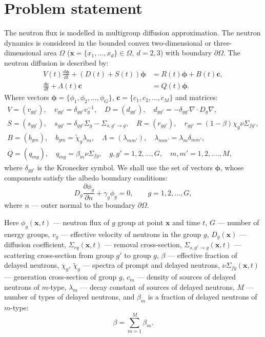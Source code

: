 \documentclass[a4paper]{jpconf}
\begin{document}
\section{Problem statement}
The neutron flux is modelled in multigroup diffusion approximation. The neutron dynamics is considered in the bounded convex two-dimensional or three-dimensional area  $\Omega$ ($\bm x = \{x_1, ..., x_d\} \in \Omega, \ d = 2,3$) with boundary $\partial \Omega$. The neutron diffusion is described by:
\begin{equation}\label{1}
\begin{split}
V(t) \frac{d \bm \phi}{d t} + (D(t)+S(t)) \bm \phi &= R(t) \bm \phi + B(t)\bm c,
\\
\frac{d \bm c}{d t} + \Lambda(t)\bm c &= Q(t) \bm \phi. 
\end{split}
\end{equation}  
Where vectors $\bm \phi = \{\phi_1, \phi_2, ..., \phi_G\}$, $\bm c = \{c_1, c_2, ..., c_M\}$ 
and matrices:
\[
\begin{aligned}
 V = (v_{g g'}), \quad v_{g g'} = \delta_{g g'} v_g^{-1}, \quad 
 D = (d_{g g'}), \quad d_{g g'} = - \delta_{g g'} \nabla \cdot D_g \nabla, \\
 S = (s_{g g'}), \quad  s_{g g'} =  \delta_{g g'} \Sigma_g - \Sigma_{s,g'\rightarrow g}, \quad R  = (r_{g g'}), \quad  r_{g g'} = (1-\beta)\chi_g \nu \Sigma_{fg'}, \\
 B = (b_{g m}), \quad b_{g m}  = \widetilde{\chi}_g \lambda_m, \quad
\Lambda = (\lambda_{m m'}), \quad  \lambda_{m m'} = \lambda_m \delta_{m m'}, \\
 Q = (q_{mg}), \quad  q_{mg}  = \beta_m \nu \Sigma_{fg}, \quad g, g' = 1,2, ..., G, \quad 
 m, m' = 1,2, ....,M,
\end{aligned}
\]
where
$\delta_{g g'}$ is the Kronecker symbol. We shall use the set of vectors $\bm \phi$, whose components 
satisfy the albedo boundary conditions: 
\begin{equation}\label{2}
 D_g\frac{\partial \phi_g}{\partial n} + \gamma_g \phi_g = 0, \quad 
 \quad g = 1,2, ..., G ,
\end{equation}
where $n$ --- outer normal to the boundary $\partial \Omega$.

Here $\phi_g(\bm x,t)$ --- neutron flux of $g$ group at point $\bm x$ and time $t$,
$G$ --- number of energy groups,
$v_g$ --- effective velocity of neutrons in the group $g$,
$D_g(\bm x)$ --- diffusion coefficient, $\Sigma_{rg}(\bm x,t)$ --- removal cross-section,
$\Sigma_{s,g'\rightarrow g}(\bm x,t)$ --- scattering cross-section from group $g'$ to group $g$,
$\beta$ --- effective fraction of delayed neutrons, $\chi_g$, $\widetilde{\chi}_g$  --- spectra of prompt and delayed neutrons, 
$\nu\Sigma_{fg}(\bm x,t)$ --- generation cross-section of group $g$,
$c_m$ --- density of sources of delayed neutrons of $m$-type,  $\lambda_m$ --- decay constant of sources of delayed neutrons,
$M$ --- number of types of delayed neutrons,  and $\beta_m$ is a fraction of delayed neutrons of $m$-type:
\[
 \beta = \sum_{m=1}^{M} \beta_m .
\] 
\end{document}
